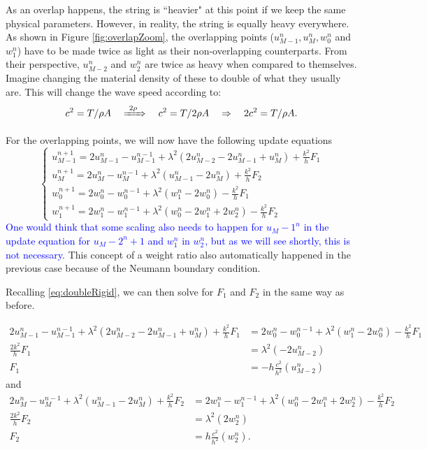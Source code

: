 \documentclass[dvipsnames]{article}
\def\SWcomment[#1]{\textcolor{blue}{#1}}
\begin{document}
As an overlap happens, the string is ``heavier" at this point if we keep the same physical parameters. However, in reality, the string is equally heavy everywhere. As shown in Figure \ref{fig:overlapZoom}, the overlapping points ($u_{M-1}^n, u_{M}^n, w_0^n$ and $w_1^n$) have to be made twice as light as their non-overlapping counterparts. From their perspective, $u_{M-2}^n$ and $w_2^n$ are twice as heavy when compared to themselves. Imagine changing the material density of these to double of what they usually are. This will change the wave speed according to:
\begin{equation}
    c^2 = T/\rho A \quad \xRightarrow[]{\ 2\rho\ }\quad c^2 = T/2\rho A \quad \Rightarrow \quad 2c^2 = T/\rho A.
\end{equation}

For the overlapping points, we will now have the following update equations
\begin{equation}\label{eq:updateOverlap}
    \begin{cases}
        u_{M-1}^{n+1} = 2u_{M-1}^n - u_{M-1}^{n-1} + \lambda^2 (2u_{M-2}^n - 2u_{M-1}^n + u_{M}^n) + \frac{k^2}{h}F_1\\
        u_{M}^{n+1} = 2u_{M}^n - u_{M}^{n-1} + \lambda^2 (u_{M-1}^n - 2u_M^n) + \frac{k^2}{h}F_2\\
        w_0^{n+1} = 2w_0^n-w_0^{n-1} + \lambda^2 (w_1^n-2w_0^n) - \frac{k^2}{h}F_1\\
        w_1^{n+1} = 2w_1^n-w_1^{n-1} + \lambda^2 (w_0^n-2w_1^n+2w_2^n) - \frac{k^2}{h}F_2
    \end{cases}
\end{equation}
\SWcomment[One would think that some scaling also needs to happen for $u_{M-1}^n$ in the update equation for $u_{M-2}^{n+1}$ and $w_1^n$ in $w_2^n$, but as we will see shortly, this is not necessary.]
This concept of a weight ratio also automatically happened in the previous case because of the Neumann boundary condition.

Recalling \eqref{eq:doubleRigid}, we can then solve for $F_1$ and $F_2$ in the same way as before. 

\begin{align}
    2u_{M-1}^n - u_{M-1}^{n-1} + \lambda^2(2u_{M-2}^n-2u_{M-1}^n + u_{M}^n) + \frac{k^2}{h} F_1 &=
    2w_0^n - w_0^{n-1} + \lambda^2(w_1^n-2w_0^n) - \frac{k^2}{h} F_1\nonumber\\
    \frac{2k^2}{h}F_1 &= \lambda^2(- 2u_{M-2}^n)\nonumber\\
    F_1 &= -h \frac{c^2}{h^2}(u_{M-2}^n)
\end{align}
and 
\begin{align}
    2u_M^n - u_M^{n-1} + \lambda^2(u_{M-1}^n-2u_M^n) + \frac{k^2}{h} F_2 &=
    2w_1^n - w_1^{n-1} + \lambda^2(w_0^n-2w_1^n+2w_2^n) - \frac{k^2}{h} F_2\nonumber\\
    \frac{2k^2}{h}F_2 &= \lambda^2(2w_2^n)\nonumber\\
    F_2 &= h \frac{c^2}{h^2}(w_2^n).
\end{align}
\end{document}
